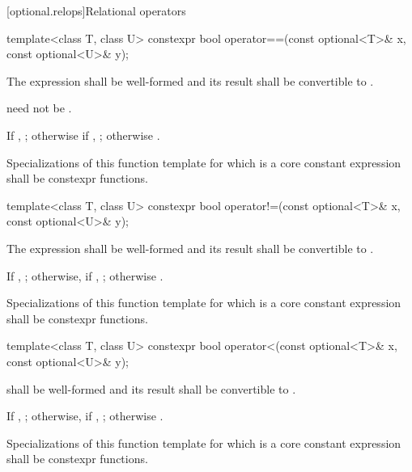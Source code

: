 [optional.relops]{Relational operators}

%
\begin{itemdecl}
template<class T, class U> constexpr bool operator==(const optional<T>& x, const optional<U>& y);
\end{itemdecl}

\begin{itemdescr}
\pnum
\requires
The expression  shall be well-formed and
its result shall be convertible to .
\begin{note}  need not be . \end{note}

\pnum
\returns
If , ; otherwise if , ; otherwise .

\pnum
\remarks
Specializations of this function template
for which  is a core constant expression
shall be constexpr functions.
\end{itemdescr}

%
\begin{itemdecl}
template<class T, class U> constexpr bool operator!=(const optional<T>& x, const optional<U>& y);
\end{itemdecl}

\begin{itemdescr}
\pnum
\requires
The expression  shall be well-formed and
its result shall be convertible to .

\pnum
\returns
If , ;
otherwise, if , ;
otherwise .

\pnum
\remarks
Specializations of this function template
for which  is a core constant expression
shall be constexpr functions.
\end{itemdescr}

%
\begin{itemdecl}
template<class T, class U> constexpr bool operator<(const optional<T>& x, const optional<U>& y);
\end{itemdecl}

\begin{itemdescr}
\pnum
\requires
{} shall be well-formed
and its result shall be convertible to .

\pnum
\returns
If , ;
otherwise, if , ;
otherwise .

\pnum
\remarks
Specializations of this function template
for which  is a core constant expression
shall be constexpr functions.
\end{itemdescr}

